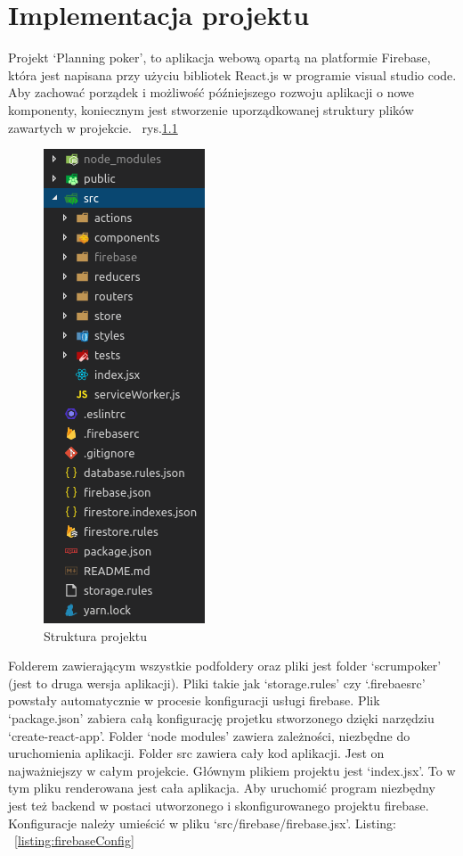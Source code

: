 \chapter{Implementacja projektu}

Projekt `Planning poker', to aplikacja webową opartą na platformie Firebase,
która jest napisana przy użyciu bibliotek React.js w programie visual studio code.
Aby zachować porządek i możliwość późniejszego rozwoju aplikacji o nowe komponenty,
koniecznym jest stworzenie uporządkowanej struktury plików zawartych w projekcie.
~rys.\ref{rys:projekt}
\begin{figure}[H]
	\centering\includegraphics[width=.2\textwidth]{img/projekt}
	\caption{Struktura projektu}\label{rys:projekt}%
\end{figure}
Folderem zawierającym wszystkie podfoldery oraz pliki jest folder `scrumpoker' (jest to druga wersja aplikacji).
Pliki takie jak `storage.rules' czy `.firebaesrc' powstały automatycznie w procesie konfiguracji usługi firebase.
Plik `package.json' zabiera całą konfigurację projetku stworzonego dzięki narzędziu `create-react-app'.
Folder `node modules' zawiera zależności, niezbędne do uruchomienia aplikacji.
    Folder src zawiera cały kod aplikacji. Jest on najważniejszy w całym projekcie.
Głównym plikiem projektu jest `index.jsx'. To w tym pliku renderowana jest cała aplikacja.
Aby uruchomić program niezbędny jest też backend w postaci utworzonego i skonfigurowanego projektu firebase.
Konfiguracje należy umieścić w pliku `src/firebase/firebase.jsx'. Listing:
~\ref{listing:firebaseConfig} 

